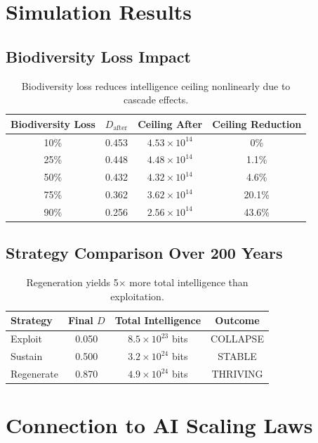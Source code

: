 \documentclass{article}
\begin{document}
\section{Simulation Results}

\subsection{Biodiversity Loss Impact}

\begin{table}[h]
\centering
\begin{tabular}{@{}cccc@{}}
\toprule
Biodiversity Loss & $D_{\text{after}}$ & Ceiling After & Ceiling Reduction \\
\midrule
10\% & 0.453 & $4.53 \times 10^{14}$ & 0\% \\
25\% & 0.448 & $4.48 \times 10^{14}$ & 1.1\% \\
50\% & 0.432 & $4.32 \times 10^{14}$ & 4.6\% \\
75\% & 0.362 & $3.62 \times 10^{14}$ & 20.1\% \\
90\% & 0.256 & $2.56 \times 10^{14}$ & 43.6\% \\
\bottomrule
\end{tabular}
\caption{Biodiversity loss reduces intelligence ceiling nonlinearly due to cascade effects.}
\end{table}

\subsection{Strategy Comparison Over 200 Years}

\begin{table}[h]
\centering
\begin{tabular}{@{}lccc@{}}
\toprule
Strategy & Final $D$ & Total Intelligence & Outcome \\
\midrule
Exploit & 0.050 & $8.5 \times 10^{23}$ bits & COLLAPSE \\
Sustain & 0.500 & $3.2 \times 10^{24}$ bits & STABLE \\
Regenerate & 0.870 & $4.9 \times 10^{24}$ bits & THRIVING \\
\bottomrule
\end{tabular}
\caption{Regeneration yields 5$\times$ more total intelligence than exploitation.}
\end{table}

\section{Connection to AI Scaling Laws}
\end{document}

